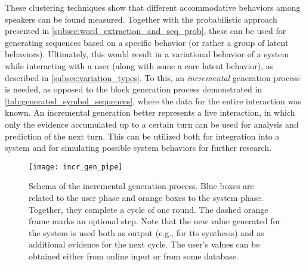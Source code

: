 These clustering techniques show that different accommodative behaviors among speakers can be found measured.
Together with the probabilistic approach presented in \cref{subsec:word_extraction_and_seq_prob}, these can be used for generating sequences based on a specific behavior (or rather a group of latent behaviors).
Ultimately, this would result in a variational behavior of a system while interacting with a user (along with some a core latent behavior), as described in \cref{subsec:variation_types}.
To this, an \emph{incremental} generation process is needed, as opposed to the block generation process demonstrated in \cref{tab:generated_symbol_sequences}, where the data for the entire interaction was known.
An incremental generation better represents a live interaction, in which only the evidence accumulated up to a certain turn can be used for analysis and prediction of the next turn.
This can be utilized both for integration into a system and for simulating possible system behaviors for further research.

\begin{figure}[t]
	\centering
	\texttt{[image: incr\_gen\_pipe]}
	\caption[Incremental generation process]
		{Schema of the incremental generation process.
		 Blue boxes are related to the user phase and orange boxes to the system phase.
		 Together, they complete a cycle of one round.
		 The dashed orange frame marks an optional step.
		 Note that the new value generated for the system is used both as output (e.g., for \ac{tts} synthesis) and as additional evidence for the next cycle.
		 The user's values can be obtained either from online input or from some database.}
	\label{fig:incr_gen_pipe}
\end{figure}

